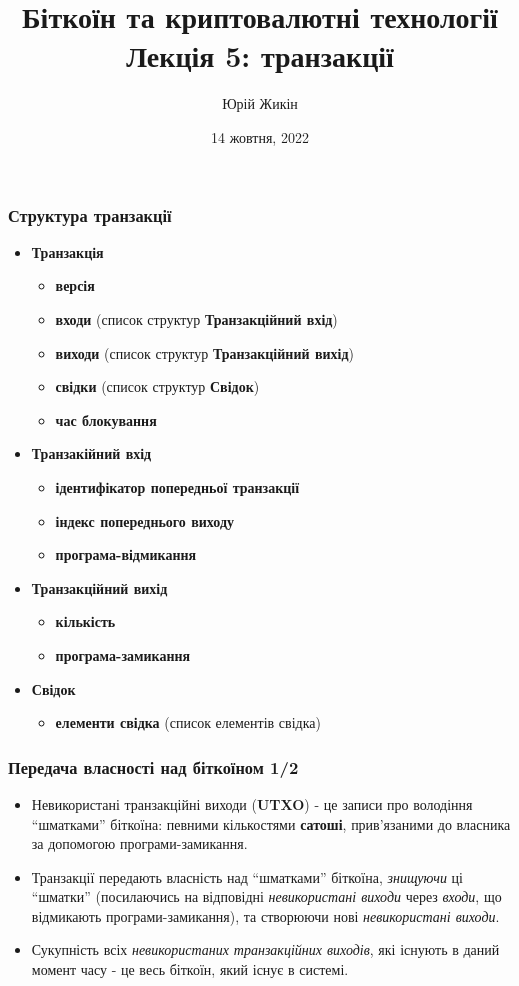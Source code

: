\documentclass{beamer}
\title{
  Біткоїн та криптовалютні технології \\
  Лекція 5: транзакції
}
\author{Юрій Жикін}
\date{14 жовтня, 2022}
\begin{document}
\frame{\titlepage}

\begin{frame}
  \frametitle{Структура транзакції}
  \begin{itemize}
  \item \textbf{Транзакція}
    \begin{itemize}
    \item \textbf{версія}
    \item \textbf{входи} (список структур \textbf{Транзакційний вхід})
    \item \textbf{виходи} (список структур \textbf{Транзакційний вихід})
    \item \textbf{свідки} (список структур \textbf{Свідок})
    \item \textbf{час блокування}
    \end{itemize}
  \item \textbf{Транзакійний вхід}
    \begin{itemize}
    \item \textbf{ідентифікатор попередньої транзакції}
    \item \textbf{індекс попереднього виходу}
    \item \textbf{програма-відмикання}
    \end{itemize}
  \item \textbf{Транзакційний вихід}
    \begin{itemize}
    \item \textbf{кількість}
    \item \textbf{програма-замикання}
    \end{itemize}
  \item \textbf{Свідок}
    \begin{itemize}
    \item \textbf{елементи свідка} (список елементів свідка)
    \end{itemize}
  \end{itemize}
\end{frame}

\begin{frame}[fragile]
  \frametitle{Передача власності над біткоїном 1/2}
  \begin{itemize}
  \item Невикористані транзакційні виходи (\textbf{UTXO}) - це записи про
    володіння ``шматками'' біткоїна: певними кількостями \textbf{сатоші},
    прив'язаними до власника за допомогою програми-замикання.
  \item Транзакції передають власність над ``шматками'' біткоїна,
    \textit{знищуючи} ці ``шматки'' (посилаючись на відповідні
    \textit{невикористані виходи} через \textit{входи}, що відмикають
    програми-замикання), та створюючи нові \textit{невикористані виходи}.
  \item Сукупність всіх \textit{невикористаних транзакційних виходів}, які
    існують в даний момент часу - це весь біткоїн, який існує в системі.
  \end{itemize}
\end{frame}
\end{document}
